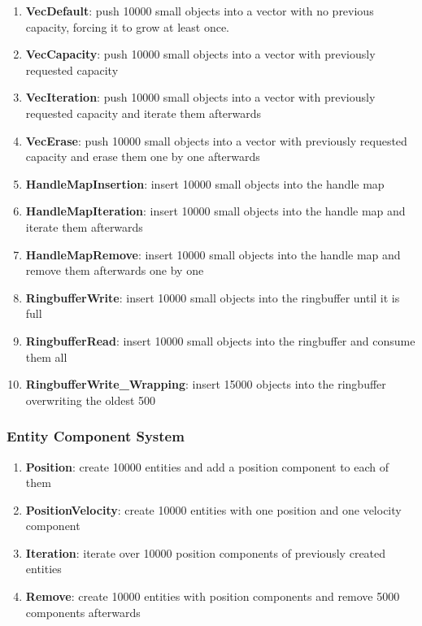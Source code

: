 \begin{enumerate}
	\item \textbf{VecDefault}: push 10000 small objects into a vector with no previous capacity, forcing it to grow at least once. 
	
	\item \textbf{VecCapacity}: push 10000 small objects into a vector with previously requested capacity
	
	\item \textbf{VecIteration}: push 10000 small objects into a vector with previously requested capacity and iterate them afterwards 

	\item \textbf{VecErase}: push 10000 small objects into a vector with previously requested capacity and erase them one by one afterwards
	
	\item \textbf{HandleMapInsertion}: insert 10000 small objects into the handle map
	
	\item \textbf{HandleMapIteration}: insert 10000 small objects into the handle map and iterate them afterwards
	
	\item \textbf{HandleMapRemove}: insert 10000 small objects into the handle map and remove them afterwards one by one
	
	\item \textbf{RingbufferWrite}: insert 10000 small objects into the ringbuffer until it is full

	\item \textbf{RingbufferRead}: insert 10000 small objects into the ringbuffer and consume them all
	
	\item \textbf{RingbufferWrite\_Wrapping}: insert 15000 objects into the ringbuffer overwriting the oldest 500	
\end{enumerate}

\subsubsection{Entity Component System}

\begin{enumerate}
	\item \textbf{Position}: create 10000 entities and add a position component to each of them
	
	\item \textbf{PositionVelocity}: create 10000 entities with one position and one velocity component
	
	\item \textbf{Iteration}: iterate over 10000 position components of previously created entities
	
	\item \textbf{Remove}: create 10000 entities with position components and remove 5000 components afterwards
\end{enumerate}

